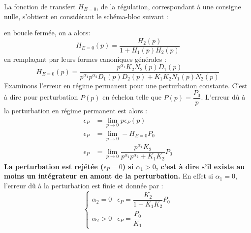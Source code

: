 La fonction de transfert $H_{E=0}$, de la régulation, correspondant à une 
consigne nulle, s'obtient en considérant le schéma-bloc suivant :
\begin{center}                                                  
    
\end{center}                                                    
\newcommand{\pau}{p^{\alpha_1}}
\newcommand{\pad}{p^{\alpha_2}}
en boucle fermée, on a alors:
\[
H_{E=0}(p)=\dfrac{H_2(p)}{1+H_1(p)H_2(p)}
\]
en remplaçant par leurs formes canoniques générales :
\[
H_{E=0}(p)=
\dfrac{\pau K_2N_2(p)D_1(p)}{\pau\pad D_1(p)D_2(p)+K_1K_2N_1(p)N_2(p)}
\]
Examinons l'erreur en régime permanent pour une perturbation constante.
C'est à dire pour perturbation $P(p)$ en échelon telle que 
$P(p)=\dfrac{P_0}{p}$. L'erreur dû à la perturbation en régime permanent 
est alors :
\begin{align*}
    \epsilon_P&=\lim\limits_{p\to0} p\epsilon_P(p)\\
    \epsilon_P&=\lim\limits_{p\to0} -H_{E=0}P_0\\
    \epsilon_P&=\lim\limits_{p\to0}\dfrac{\pau K_2}{\pau\pad+K_1K_2}P_0
\end{align*}
\textbf{La perturbation est rejétée ($\epsilon_P=0$) si $\alpha_1>0$, 
c'est à dire s'il existe au moins un intégrateur en amont de la perturbation.}
En effet si $\alpha_1=0$, l'erreur dû à la perturbation est finie et 
donnée par :
\[
    \begin{cases}
        \alpha_2=0 & \epsilon_P=\dfrac{K_2}{1+K_1K_2}P_0 \\[1.5em]
        \alpha_2>0 & \epsilon_P=\dfrac{P_0}{K_1}
    \end{cases}
\]
\newpage
